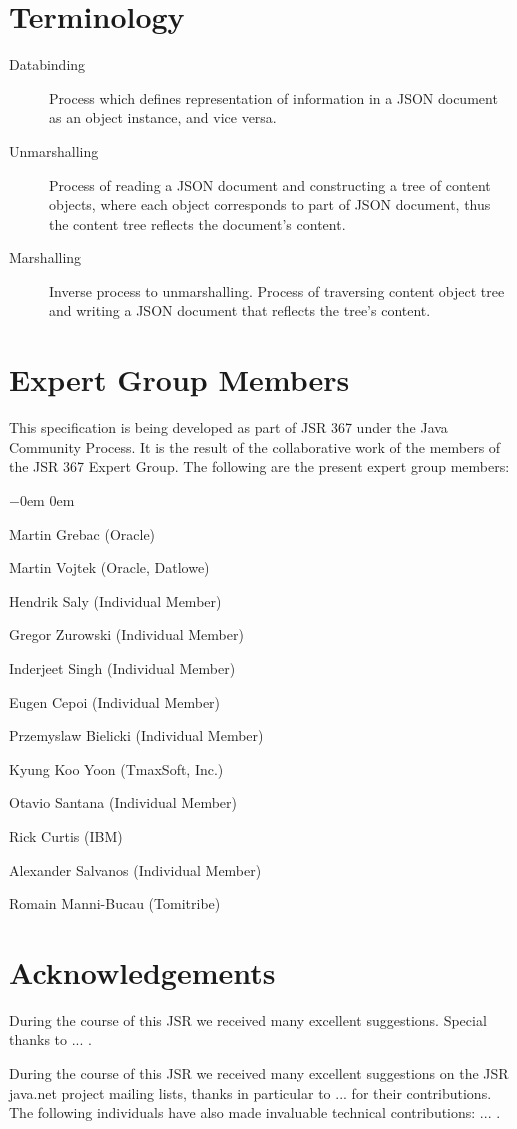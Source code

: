 \section{Terminology}
\label{terminology}

\begin{description}
\item[Databinding] Process which defines representation of information in a JSON document as an object instance, and vice versa.
\item[Unmarshalling] Process of reading a JSON document and constructing a tree of content objects, 
where each object corresponds to part of JSON document, thus the content tree reflects the document's content.
\item[Marshalling] Inverse process to unmarshalling. Process of traversing content object tree and writing a JSON document that reflects the tree's content.

\end{description}

\section{Expert Group Members} 
\label{expert_group}

This specification is being developed as part of JSR 367 under the Java Community Process. 
It is the result of the collaborative work of the members of the JSR 367 Expert Group. 
The following are the present expert group members:

\begin{list}{$-$}{\parsep 0em  0em}
\item Martin Grebac (Oracle)
\item Martin Vojtek (Oracle, Datlowe)
\item Hendrik Saly (Individual Member)
\item Gregor Zurowski (Individual Member) 
\item Inderjeet Singh (Individual Member)
\item Eugen Cepoi (Individual Member)
\item Przemyslaw Bielicki (Individual Member)
\item Kyung Koo Yoon (TmaxSoft, Inc.)
\item Otavio Santana (Individual Member)
\item Rick Curtis (IBM)
\item Alexander Salvanos (Individual Member)
\item Romain Manni-Bucau (Tomitribe)
\end{list}

\section{Acknowledgements}
\label{acks}

During the course of this JSR we received many excellent suggestions. Special thanks to ... .

During the course of this JSR we received many excellent suggestions on the JSR java.net project mailing lists, thanks in particular to ...  for their contributions. The following individuals have also made invaluable technical contributions: ... .
